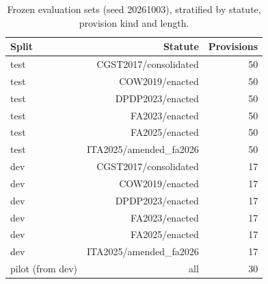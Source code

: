 \begin{table}[t]
\centering\small
\caption{Frozen evaluation sets (seed 20261003), stratified by statute, provision kind and length.}
\label{tab:eval_sets}
\begin{tabular}{lrr}
\toprule
Split & Statute & Provisions \\
\midrule
test & CGST2017/consolidated & 50 \\
test & COW2019/enacted & 50 \\
test & DPDP2023/enacted & 50 \\
test & FA2023/enacted & 50 \\
test & FA2025/enacted & 50 \\
test & ITA2025/amended\_fa2026 & 50 \\
dev & CGST2017/consolidated & 17 \\
dev & COW2019/enacted & 17 \\
dev & DPDP2023/enacted & 17 \\
dev & FA2023/enacted & 17 \\
dev & FA2025/enacted & 17 \\
dev & ITA2025/amended\_fa2026 & 17 \\
pilot (from dev) & all & 30 \\
\bottomrule
\end{tabular}
\end{table}
